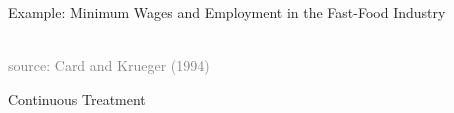 \documentclass[10pt,xcolor=table,ignorenonframetext,aspectratio=169]{beamer}
\begin{document}

\begin{frame}{Example:  Minimum Wages and Employment in the Fast-Food Industry}


\medskip
\begin{center}
	\\
	\textcolor{gray}{\tiny{source:  Card and Krueger (1994)}}
\end{center}

\end{frame}



\begin{frame}[plain]

	
	\begin{center}
		
		\Large{Continuous Treatment}
		
	\end{center}
	
\end{frame}


\end{document}
